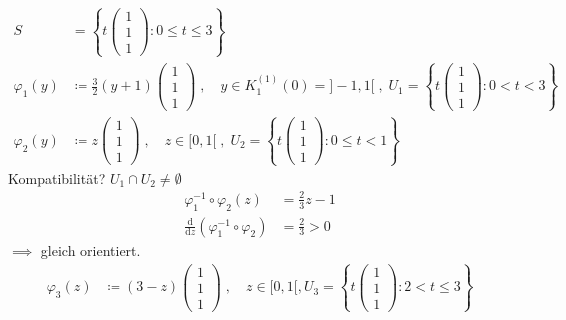 \documentclass[a4paper,10pt]{scrbook}
\begin{document}
\begin{example} \label{thm:9.10}
  \begin{enum-arab}
    \item ~
    \begin{align*}
      S &= \left\{ t \left(\begin{smallmatrix} 1 \\ 1 \\ 1 \end{smallmatrix}\right) : 0 \leq t \leq 3 \right\} \\
      \varphi_1(y) &\coloneq \frac{3}{2} (y+1) \begin{pmatrix} 1 \\ 1 \\ 1 \end{pmatrix} \; , \quad y \in K_1^{(1)}(0) = ]-1,1[ \; , \; U_1 = \left\{ t \left(\begin{smallmatrix} 1 \\ 1 \\ 1 \end{smallmatrix}\right) : 0 < t < 3 \right\} \\
      \varphi_2(y) &\coloneq z \begin{pmatrix} 1 \\ 1 \\ 1 \end{pmatrix} \; , \quad z \in [0,1[ \; , \; U_2 = \left\{ t \left(\begin{smallmatrix} 1 \\ 1 \\ 1 \end{smallmatrix}\right) : 0 \leq t < 1 \right\}
    \end{align*}
    Kompatibilität? $U_1 \cap U_2 \neq \emptyset$
    \begin{align*}
      \varphi_1^{-1} \circ \varphi_2(z) &= \frac{2}{3} z - 1 \\
      \frac{\mathrm{d}}{\mathrm{d}z} \left( \varphi_1^{-1} \circ \varphi_2 \right) &= \frac{2}{3} > 0
    \end{align*}
    $\implies$ gleich orientiert.
    \begin{align*}
      \varphi_3(z) &\coloneq (3-z) \begin{pmatrix} 1 \\ 1 \\ 1 \end{pmatrix} \; , \quad z \in [0,1[ , U_3 = \left\{ t \left(\begin{smallmatrix} 1 \\ 1 \\ 1 \end{smallmatrix}\right) : 2 < t \leq 3 \right\}

\end{align*}
\end{enum-arab}
\end{example}
\end{document}
